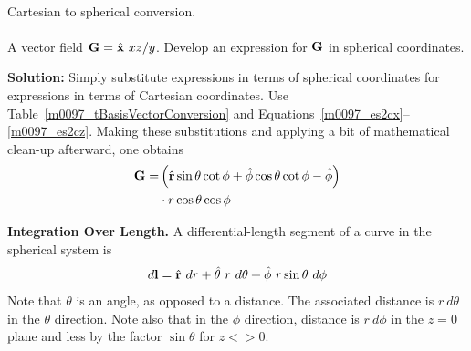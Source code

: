 ~\\ \begin{example} 
\begin{mdframed}[backgroundcolor=brown!20,linecolor=brown!20]\raggedright
Cartesian to spherical conversion. 
\\~\\
A vector field ${\bf G} = \hat{\bf x}~xz/y$.  Develop an expression for ${\bf G}$ in spherical coordinates.

{\bf Solution:} Simply substitute expressions in terms of spherical coordinates for expressions in terms of Cartesian coordinates. 
Use Table~\ref{m0097_tBasisVectorConversion} and Equations~\ref{m0097_es2cx}--\ref{m0097_es2cz}. 
Making these substitutions and applying a bit of mathematical clean-up afterward, one obtains  
%
\begin{align}
{\bf G} =& \left( \hat{\bf r}\sin\theta\cot\phi + \hat{\bf\phi}\cos\theta\cot\phi - \hat{\bf \phi} \right) \nonumber \\
         & \cdot r\cos\theta\cos\phi
\end{align}

\end{mdframed}\end{example}



{\bf Integration Over Length.}  
A differential-length segment of a curve in the spherical system is
%
\begin{equation}
d{\bf l} = \hat{\bf r}~dr + \hat{\bf \theta}~r~d\theta + \hat{\bf \phi}~r\sin\theta~d\phi 
\end{equation}
%
Note that $\theta$ is an angle, as opposed to a distance. The associated distance is $r~d\theta$ in the $\theta$ direction.
Note also that in the $\phi$ direction, distance is $r~d\phi$ in the $z=0$ plane and less by the factor $\sin\theta$ for $z<>0$. 

